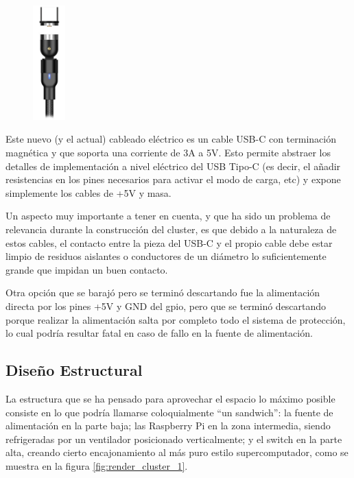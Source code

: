 \begin{figure}
  \centering
  \vspace*{-0.3cm}
  \includegraphics[width=0.11\textwidth]{img/usb_cable.jpg}
  \label{fig:usb_magnetic_termination}
\end{figure}
Este nuevo (y el actual) cableado eléctrico es un cable USB-C con terminación magnética y que soporta una corriente de 3A a 5V. Esto permite abstraer los detalles de implementación a nivel eléctrico del USB Tipo-C (es decir, el añadir resistencias en los pines necesarios para activar el modo de carga, etc) y expone simplemente los cables de +5V y masa.

Un aspecto muy importante a tener en cuenta, y que ha sido un problema de relevancia durante la construcción del cluster, es que debido a la naturaleza de estos cables, el contacto entre la pieza del USB-C y el propio cable debe estar limpio de residuos aislantes o conductores de un diámetro lo suficientemente grande que impidan un buen contacto.

Otra opción que se barajó pero se terminó descartando fue la alimentación directa por los pines +5V y GND del \acrshort{gpio}, pero que se terminó descartando porque realizar la alimentación salta por completo todo el sistema de protección, lo cual podría resultar fatal en caso de fallo en la fuente de alimentación.



\subsection{Diseño Estructural}
\label{ssec:diseño_estructural}
La estructura que se ha pensado para aprovechar el espacio lo máximo posible consiste en lo que podría llamarse coloquialmente ``un sandwich'': la fuente de alimentación en la parte baja; las Raspberry Pi en la zona intermedia, siendo refrigeradas por un ventilador posicionado verticalmente; y el switch en la parte alta, creando cierto encajonamiento al más puro estilo supercomputador, como se muestra en la figura \ref{fig:render_cluster_1}.

